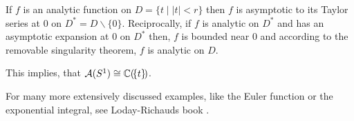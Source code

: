 \begin{exmp}
  If $f$ is an analytic function on $D=\{t\mid |t|<r\}$ then $f$ is asymptotic
  to its Taylor series at $0$ on $D^*=D\backslash\{0\}$.
  Reciprocally, if $f$ is analytic on $D^*$ and has an asymptotic expansion at
  $0$ on $D^*$ then, $f$ is bounded near $0$ and according to the removable
  singularity theorem, $f$ is analytic on $D$.
  \begin{s-rem}
    This implies, that $\mathcal{A}(S^1)\cong\mathbb{C}(\!\{t\}\!)$.
  \end{s-rem}
\end{exmp}
For many more extensively discussed examples, like the Euler function or the
exponential integral, see Loday-Richauds book \cite[Sec.2.2]{Loday2014}.
\begin{comment}
  \begin{exmp}[Fundamental example: the Euler function]
    \marginnote{\cite[Exmp.2.2.4]{Loday2014}}
    Consider the Euler equation
    \begin{equation}
      x^2\frac{dy}{dx}+y=x \,.
    \end{equation}
    \TODO[]
  \end{exmp}
  \begin{exmp}[Classical example: the exponential integral]
    \marginnote{\cite[Exmp.2.2.5]{Loday2014}}
    Consider the exponential integral
    \begin{equation}
      Ei(x)=\int_x^{+\infty}e^{-t}\frac{dt}{t} \,.
    \end{equation}
    \TODO[]
  \end{exmp}
  \begin{exmp}[A generalized hypergeometric series ${}_3F_0$]
    \marginnote{\cite[Exmp.2.2.6]{Loday2014}}
    \TODO[]
  \end{exmp}
  \begin{exmp}[A series of a mild difference equation]
    \marginnote{\cite[Exmp.2.2.7]{Loday2014}}
    \TODO[]
  \end{exmp}
  \begin{exmp}[A series of a wild difference equation]
    \marginnote{\cite[Exmp.2.2.8]{Loday2014}}
    \TODO[]
  \end{exmp}
\end{comment}

